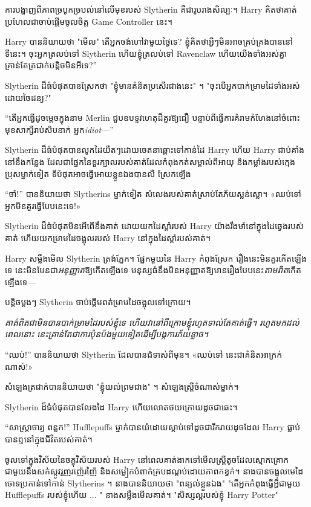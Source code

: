 ការបង្ហាញពីភាពច្របូកច្របល់នៅលើមុខរបស់ Slytherin គឺជារូបរាងសិល្បៈ។ Harry គិតថាគាត់ប្រហែលជាចាប់ផ្តើមចូលចិត្ត Game Controller នេះ។

Harry បាននិយាយថា "មើល" តើអ្នកចង់ហៅវាមួយថ្ងៃទេ? ខ្ញុំ​គិត​ថា​អ្វីៗ​មិន​អាច​គ្រប់គ្រង​បាន​នៅ​ទីនេះ។ ចុះអ្នកត្រលប់ទៅ Slytherin ហើយខ្ញុំត្រលប់ទៅ Ravenclaw ហើយយើងទាំងអស់គ្នាគ្រាន់តែត្រជាក់បន្តិចមិនអីទេ?”

Slytherin ដ៏ធំបំផុតបានស្រែកថា "ខ្ញុំមានគំនិតប្រសើរជាងនេះ" ។ "ចុះបើអ្នកបាក់ម្រាមដៃទាំងអស់ដោយចៃដន្យ?"

“តើអ្នកធ្វើដូចម្តេចក្នុងនាម Merlin ជួបឧបទ្ទវហេតុដ៏គួរឱ្យជឿ បន្ទាប់ពីធ្វើការគំរាមកំហែងនៅចំពោះមុខសាក្សីរាប់សិបនាក់ អ្នក\emph{idiot}—”

Slytherin ដ៏ធំបំផុតបានលូកដៃយឺតៗដោយចេតនាឆ្ពោះទៅកាន់ដៃ Harry ហើយ Harry ជាប់គាំងនៅនឹងកន្លែង ដែលជាផ្នែកនៃខួរក្បាលរបស់គាត់ដែលកំពុងកត់សម្គាល់ពីអាយុ និងកម្លាំងរបស់ក្មេងប្រុសម្នាក់ទៀត ទីបំផុតអាចធ្វើអោយខ្លួនឯងបានលឺ ស្រែកឡើង 

“ចាំ!” បាននិយាយថា Slytherins ម្នាក់ទៀត សំលេងរបស់គាត់ស្រាប់តែភ័យស្លន់ស្លោ។ «ឈប់ទៅ អ្នកមិនគួរធ្វើបែបនេះទេ!»

Slytherin ដ៏ធំបំផុតមិនអើពើនឹងគាត់ ដោយយកដៃស្តាំរបស់ Harry យ៉ាងរឹងមាំនៅក្នុងដៃឆ្វេងរបស់គាត់ ហើយយកម្រាមដៃចង្អុលរបស់ Harry នៅក្នុងដៃស្តាំរបស់គាត់។

Harry សម្លឹងមើល Slytherin ត្រង់ភ្នែក។ ផ្នែកមួយនៃ Harry កំពុងស្រែក រឿងនេះមិនគួរកើតឡើងទេ នេះមិនមែនជា\emph{អនុញ្ញាត}ឱ្យកើតឡើងទេ មនុស្សធំនឹងមិនអនុញ្ញាតឱ្យមានរឿងបែបនេះ\emph{តាមពិត}កើតឡើងទេ—

បន្តិចម្ដងៗ Slytherin ចាប់ផ្តើមពត់ម្រាមដៃចង្អុលទៅក្រោយ។

\emph{គាត់ពិតជាមិនបានបាក់ម្រាមដៃរបស់ខ្ញុំទេ ហើយវានៅពីក្រោមខ្ញុំរហូតទាល់តែគាត់ធ្វើ។ រហូត​មក​ដល់​ពេល​នោះ នេះ​គ្រាន់​តែ​ជា​ការ​ប៉ុនប៉ង​មួយ​ទៀត​ដើម្បី​បង្ក​ការ​ភ័យ​ខ្លាច។}

“ឈប់!” បាននិយាយថា Slytherin ដែលបានជំទាស់ពីមុន។ «ឈប់ទៅ នេះជាគំនិតអាក្រក់ណាស់!»

សំឡេងត្រជាក់បាននិយាយថា "ខ្ញុំយល់ព្រមជាង" ។ សំឡេងស្ត្រីចំណាស់ម្នាក់។

Slytherin ដ៏ធំបំផុតបានលែងដៃ Harry ហើយលោតថយក្រោយដូចជាឆេះ។

“សាស្រ្តាចារ្យ ពន្លក!” Hufflepuffs ម្នាក់បានយំដោយស្តាប់ទៅដូចជារីករាយដូចដែល Harry ធ្លាប់បានឮនៅក្នុងជីវិតរបស់គាត់។

ចូលទៅក្នុងវិស័យនៃចក្ខុវិស័យរបស់ Harry នៅពេលគាត់ងាកទៅមើលស្ត្រីតូចដែលស្មោកគ្រោកជាមួយនឹងសក់ស្កូវរួញរញ៉េរញ៉ៃ និងសម្លៀកបំពាក់គ្របដណ្តប់ដោយភាពកខ្វក់។ នាង​បាន​ចង្អុល​មេដៃ​ចោទ​ប្រកាន់​ទៅ​កាន់ Slytherins ។ នាងបាននិយាយថា "ពន្យល់ខ្លួនឯង" "តើអ្នកកំពុងធ្វើអ្វីជាមួយ Hufflepuffs របស់ខ្ញុំហើយ ... " នាងសម្លឹងមើលគាត់។ "សិស្សល្អរបស់ខ្ញុំ Harry Potter"

